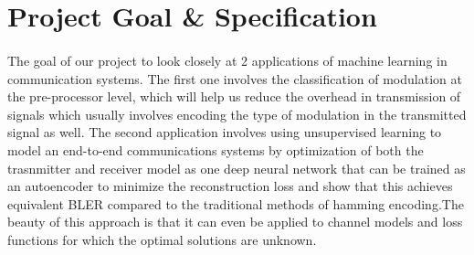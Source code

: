 \section{Project Goal \& Specification}
\paragraph{}The goal of our project to look closely at 2 applications of machine learning in communication systems. The first one involves the classification of modulation at the pre-processor level, which will help us reduce the overhead in transmission of signals which usually involves encoding the type of modulation in the transmitted signal as well. The second application involves using unsupervised learning to model an end-to-end communications systems by optimization of both the trasnmitter and receiver model as one deep neural network that can be trained as an autoencoder to minimize the reconstruction loss and show that this achieves equivalent BLER compared to the traditional methods of hamming encoding.The beauty of this approach is that it can even be applied to channel models and loss functions for which the optimal solutions are unknown.

